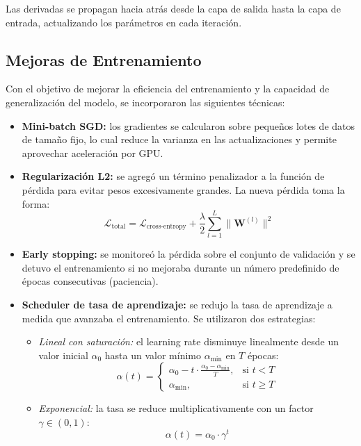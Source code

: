 \documentclass[11pt]{article}
\begin{document}
Las derivadas se propagan hacia atrás desde la capa de salida hasta la capa de entrada, actualizando los parámetros en cada iteración.

\subsection*{Mejoras de Entrenamiento}

Con el objetivo de mejorar la eficiencia del entrenamiento y la capacidad de generalización del modelo, se incorporaron las siguientes técnicas:

\begin{itemize}
    \item \textbf{Mini-batch SGD:} los gradientes se calcularon sobre pequeños lotes de datos de tamaño fijo, lo cual reduce la varianza en las actualizaciones y permite aprovechar aceleración por GPU.

    \item \textbf{Regularización L2:} se agregó un término penalizador a la función de pérdida para evitar pesos excesivamente grandes. La nueva pérdida toma la forma:
    \[
    \mathcal{L}_{\text{total}} = \mathcal{L}_{\text{cross-entropy}} + \frac{\lambda}{2} \sum_{l=1}^L \| \mathbf{W}^{(l)} \|^2
    \]

    \item \textbf{Early stopping:} se monitoreó la pérdida sobre el conjunto de validación y se detuvo el entrenamiento si no mejoraba durante un número predefinido de épocas consecutivas (paciencia).

    \item \textbf{Scheduler de tasa de aprendizaje:} se redujo la tasa de aprendizaje a medida que avanzaba el entrenamiento. Se utilizaron dos estrategias:

    \begin{itemize}
        \item \textit{Lineal con saturación:} el learning rate disminuye linealmente desde un valor inicial \( \alpha_0 \) hasta un valor mínimo \( \alpha_{\text{min}} \) en \( T \) épocas:
        \[
        \alpha(t) =
        \begin{cases}
        \alpha_0 - t \cdot \frac{\alpha_0 - \alpha_{\text{min}}}{T}, & \text{si } t < T \\
        \alpha_{\text{min}}, & \text{si } t \geq T
        \end{cases}
        \]

        \item \textit{Exponencial:} la tasa se reduce multiplicativamente con un factor \( \gamma \in (0,1) \):
        \[
        \alpha(t) = \alpha_0 \cdot \gamma^t
        \]
    \end{itemize}


\end{itemize}
\end{document}
